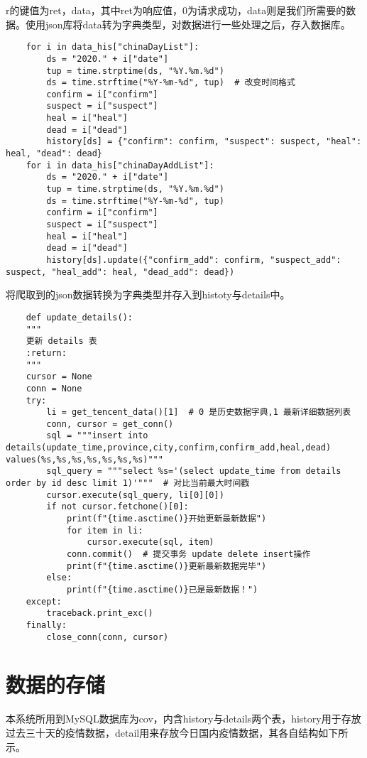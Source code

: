 r的键值为ret，data，其中ret为响应值，0为请求成功，data则是我们所需要的数据。使用json库将data转为字典类型，对数据进行一些处理之后，存入数据库。


\begin{lstlisting}
    for i in data_his["chinaDayList"]:
        ds = "2020." + i["date"]
        tup = time.strptime(ds, "%Y.%m.%d")
        ds = time.strftime("%Y-%m-%d", tup)  # 改变时间格式
        confirm = i["confirm"]
        suspect = i["suspect"]
        heal = i["heal"]
        dead = i["dead"]
        history[ds] = {"confirm": confirm, "suspect": suspect, "heal": heal, "dead": dead}
    for i in data_his["chinaDayAddList"]:
        ds = "2020." + i["date"]
        tup = time.strptime(ds, "%Y.%m.%d")
        ds = time.strftime("%Y-%m-%d", tup)
        confirm = i["confirm"]
        suspect = i["suspect"]
        heal = i["heal"]
        dead = i["dead"]
        history[ds].update({"confirm_add": confirm, "suspect_add": suspect, "heal_add": heal, "dead_add": dead})
\end{lstlisting}

将爬取到的json数据转换为字典类型并存入到histoty与details中。

\begin{lstlisting}
    def update_details():
    """
    更新 details 表
    :return:
    """
    cursor = None
    conn = None
    try:
        li = get_tencent_data()[1]  # 0 是历史数据字典,1 最新详细数据列表
        conn, cursor = get_conn()
        sql = """insert into details(update_time,province,city,confirm,confirm_add,heal,dead) values(%s,%s,%s,%s,%s,%s,%s)"""
        sql_query = """select %s='(select update_time from details order by id desc limit 1)'"""  # 对比当前最大时间戳
        cursor.execute(sql_query, li[0][0])
        if not cursor.fetchone()[0]:
            print(f"{time.asctime()}开始更新最新数据")
            for item in li:
                cursor.execute(sql, item)
            conn.commit()  # 提交事务 update delete insert操作
            print(f"{time.asctime()}更新最新数据完毕")
        else:
            print(f"{time.asctime()}已是最新数据！")
    except:
        traceback.print_exc()
    finally:
        close_conn(conn, cursor)
\end{lstlisting}

\section{数据的存储}

本系统所用到MySQL数据库为cov，内含history与details两个表，history用于存放过去三十天的疫情数据，detail用来存放今日国内疫情数据，其各自结构如下所示。


